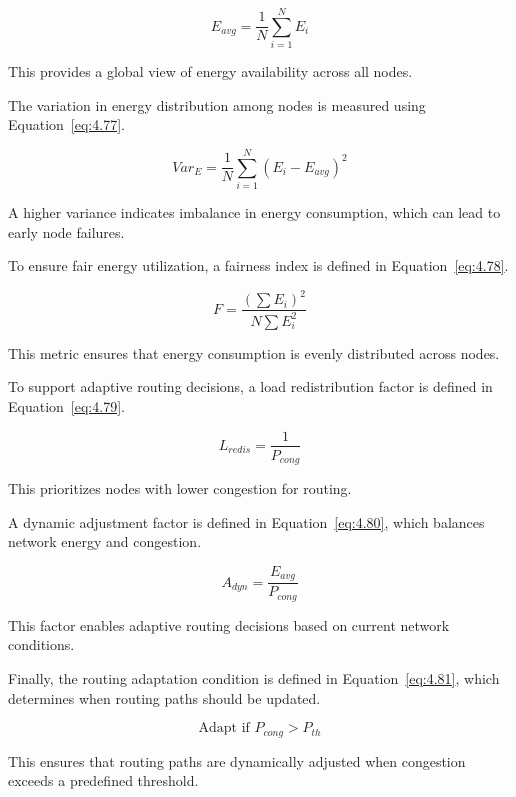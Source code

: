\documentclass[a4paper,fleqn]{cas-dc}
\numberwithin{equation}{section}
\begin{document}
\begin{equation}
E_{avg} = \frac{1}{N} \sum_{i=1}^{N} E_i
\label{eq:4.76}
\end{equation}

This provides a global view of energy availability across all nodes.

The variation in energy distribution among nodes is measured using Equation~\ref{eq:4.77}.

\begin{equation}
Var_E = \frac{1}{N} \sum_{i=1}^{N} (E_i - E_{avg})^2
\label{eq:4.77}
\end{equation}

A higher variance indicates imbalance in energy consumption, which can lead to early node failures.

To ensure fair energy utilization, a fairness index is defined in Equation~\ref{eq:4.78}.

\begin{equation}
F = \frac{(\sum E_i)^2}{N \sum E_i^2}
\label{eq:4.78}
\end{equation}

This metric ensures that energy consumption is evenly distributed across nodes.

To support adaptive routing decisions, a load redistribution factor is defined in Equation~\ref{eq:4.79}.

\begin{equation}
L_{redis} = \frac{1}{P_{cong}}
\label{eq:4.79}
\end{equation}

This prioritizes nodes with lower congestion for routing.

A dynamic adjustment factor is defined in Equation~\ref{eq:4.80}, which balances network energy and congestion.

\begin{equation}
A_{dyn} = \frac{E_{avg}}{P_{cong}}
\label{eq:4.80}
\end{equation}

This factor enables adaptive routing decisions based on current network conditions.

Finally, the routing adaptation condition is defined in Equation~\ref{eq:4.81}, which determines when routing paths should be updated.

\begin{equation}
\text{Adapt if } P_{cong} > P_{th}
\label{eq:4.81}
\end{equation}

This ensures that routing paths are dynamically adjusted when congestion exceeds a predefined threshold.
\end{document}
